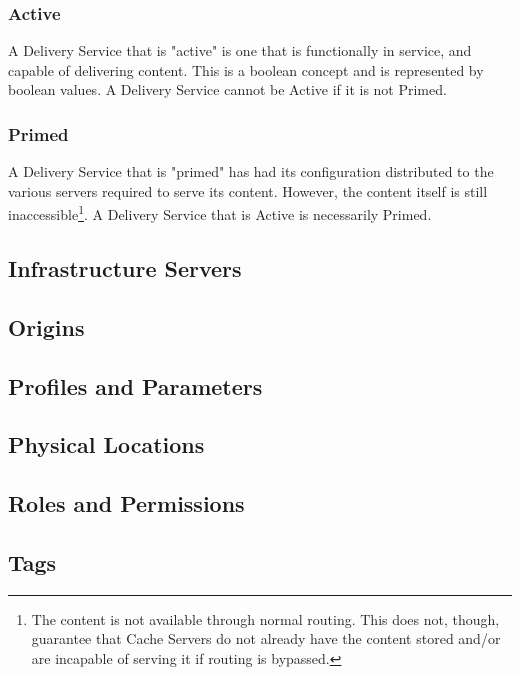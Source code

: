 \subsubsection{Active}
A Delivery Service that is "active" is one that is functionally in service, and
capable of delivering content. This is a boolean concept and is represented by
boolean values. A Delivery Service cannot be Active if it is not Primed.

\subsubsection{Primed}
A Delivery Service that is "primed" has had its configuration distributed to the
various servers required to serve its content. However, the content itself is
still inaccessible\footnote{The content is not available through normal routing.
This does not, though, guarantee that Cache Servers do not already have the
content stored and/or are incapable of serving it if routing is bypassed.}. A
Delivery Service that is Active is necessarily Primed.



\subsection{Infrastructure Servers}



\subsection{Origins}



\subsection{Profiles and Parameters}



\subsection{Physical Locations}



\subsection{Roles and Permissions\label{sec:roles-and-perms}}



\subsection{Tags}



